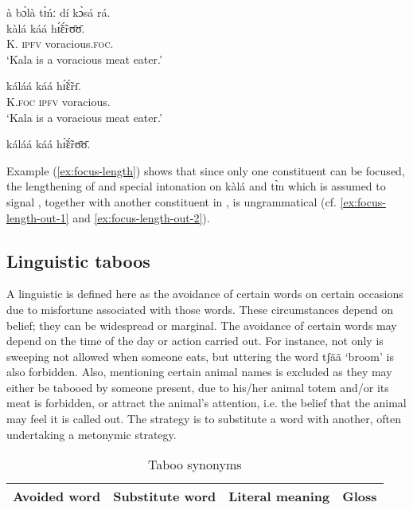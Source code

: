 \begin{exe}
\begin{exe}
\begin{exe}
\begin{exe}
\begin{exe}
\begin{exe}
\begin{exe}
\begin{exe}
\begin{exe}
\begin{exe}
\begin{exe}
\begin{exe}
 \ex\label{ex:focus-length-out-1}  \textasteriskcentered à bɔ̀là tɪ̀ńː  dí kɔ̀sá rá.\\
 
 \ex
\gll  kàlá káá hɪ̃́ɛ̃́rʊ̄ʊ̄.\\
K. \textsc{ipfv} voracious.\textsc{foc}.\\
\glt  `Kala is {\sc a voracious meat eater}.'

 \ex
\gll  káláá káá hɪ̃́ɛ̃́rɪ̄.\\
K.\textsc{foc} \textsc{ipfv} voracious.\\
\glt  `{\sc Kala} is a voracious meat eater.'

 \ex\label{ex:focus-length-out-2}  \textasteriskcentered káláá káá hɪ̃́ɛ̃́rʊ̄ʊ̄.\\
\z 
 \z
 
 Example (\ref{ex:focus-length}) shows that since only one constituent can be focused, the  lengthening of and special intonation on   {\sls kàlá} and {\sls tɪ̀n}  which is assumed to signal , together with another constituent in , is ungrammatical (cf. \ref{ex:focus-length-out-1} and  \ref{ex:focus-length-out-2}). 


\subsection{Linguistic taboos}
\label{sec:GRM-ling-taboo}


A linguistic  is defined here as the avoidance of certain words on certain occasions due to  misfortune associated with those words. These circumstances depend on belief; they can be widespread or marginal. The avoidance of certain words may depend on the time of the day or action carried out. For instance, not only  is sweeping  not allowed when someone eats, but uttering the word {\sls tʃãã} `broom' is also forbidden. Also, mentioning certain animal names is excluded as they may either be tabooed by someone present, due to his/her animal totem and/or its meat is forbidden,  or attract the animal's attention, i.e. the belief that the  animal may feel it is called out. The strategy is to substitute a word with another, often undertaking a  metonymic strategy. 

\begin{table}[!htb]
\small
\centering
\caption{Taboo synonyms \label{ex:GRM-taboo-synonyms}}

\begin{tabular}{llll}
\lsptoprule
 Avoided word & Substitute word & Literal meaning & Gloss\\
\midrule


\end{tabular}
\end{table}
\end{exe}
\end{exe}
\end{exe}
\end{exe}
\end{exe}
\end{exe}
\end{exe}
\end{exe}
\end{exe}
\end{exe}
\end{exe}
\end{exe}
